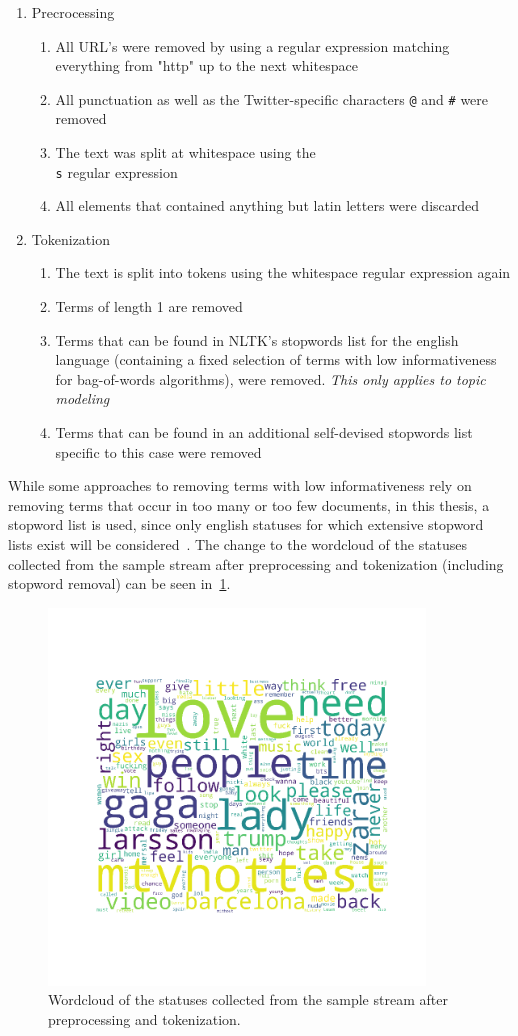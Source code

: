 \begin{enumerate}
    \item Precrocessing
    \begin{enumerate}
        \item All URL's were removed by using a regular expression matching everything from "http" up to the next whitespace
        \item All punctuation as well as the Twitter-specific characters \texttt{@} and \texttt{\#} were removed
        \item The text was split at whitespace using the \texttt{\\s} regular expression
        \item All elements that contained anything but latin letters were discarded
    \end{enumerate}
    \item Tokenization
    \begin{enumerate}
        \item The text is split into tokens using the whitespace regular expression again
        \item Terms of length 1 are removed
        \item Terms that can be found in NLTK's stopwords list for the english language
        (containing a fixed selection of terms with low informativeness for bag-of-words algorithms),
        were removed. \textit{This only applies to topic modeling}
        \item Terms that can be found in an additional self-devised stopwords list specific to this case were removed
    \end{enumerate}
\end{enumerate}

While some approaches to removing terms with low informativeness rely on removing terms that occur in too many or too few documents,
in this thesis, a stopword list is used,
since only english statuses for which extensive stopword lists exist will be considered~\cite{Porter2001}.
The change to the wordcloud of the statuses collected from the sample stream after preprocessing and tokenization (including stopword removal) can be seen in~\ref{fig:wordloud_post}.

\begin{figure}
    \centering
    \caption{Wordcloud of the statuses collected from the sample stream after preprocessing and tokenization.}
    \label{fig:wordloud_post}
    \includegraphics[width=10cm]{../images/wordcloud_post.png}
\end{figure}
